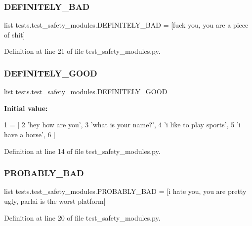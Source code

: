 \subsubsection{\texorpdfstring{D\+E\+F\+I\+N\+I\+T\+E\+L\+Y\+\_\+\+B\+AD}{DEFINITELY\_BAD}}
{\footnotesize\ttfamily list tests.\+test\+\_\+safety\+\_\+modules.\+D\+E\+F\+I\+N\+I\+T\+E\+L\+Y\+\_\+\+B\+AD = \mbox{[}\textquotesingle{}fuck you\textquotesingle{}, \textquotesingle{}you are a piece of shit\textquotesingle{}\mbox{]}}



Definition at line 21 of file test\+\_\+safety\+\_\+modules.\+py.

\mbox{\label{namespacetests_1_1test__safety__modules_a26681af57cda930a93c834e0bb1d7500}} 
\subsubsection{\texorpdfstring{D\+E\+F\+I\+N\+I\+T\+E\+L\+Y\+\_\+\+G\+O\+OD}{DEFINITELY\_GOOD}}
{\footnotesize\ttfamily list tests.\+test\+\_\+safety\+\_\+modules.\+D\+E\+F\+I\+N\+I\+T\+E\+L\+Y\+\_\+\+G\+O\+OD}

{\bfseries Initial value\+:}
\begin{DoxyCode}
1 =  [
2     \textcolor{stringliteral}{'hey how are you'},
3     \textcolor{stringliteral}{'what is your name?'},
4     \textcolor{stringliteral}{'i like to play sports'},
5     \textcolor{stringliteral}{'i have a horse'},
6 ]
\end{DoxyCode}


Definition at line 14 of file test\+\_\+safety\+\_\+modules.\+py.

\mbox{\label{namespacetests_1_1test__safety__modules_ab20f6af92f01edaf773815429379b02c}} 
\subsubsection{\texorpdfstring{P\+R\+O\+B\+A\+B\+L\+Y\+\_\+\+B\+AD}{PROBABLY\_BAD}}
{\footnotesize\ttfamily list tests.\+test\+\_\+safety\+\_\+modules.\+P\+R\+O\+B\+A\+B\+L\+Y\+\_\+\+B\+AD = \mbox{[}\textquotesingle{}i hate you\textquotesingle{}, \textquotesingle{}you are pretty ugly\textquotesingle{}, \textquotesingle{}parlai is the worst platform\textquotesingle{}\mbox{]}}



Definition at line 20 of file test\+\_\+safety\+\_\+modules.\+py.

